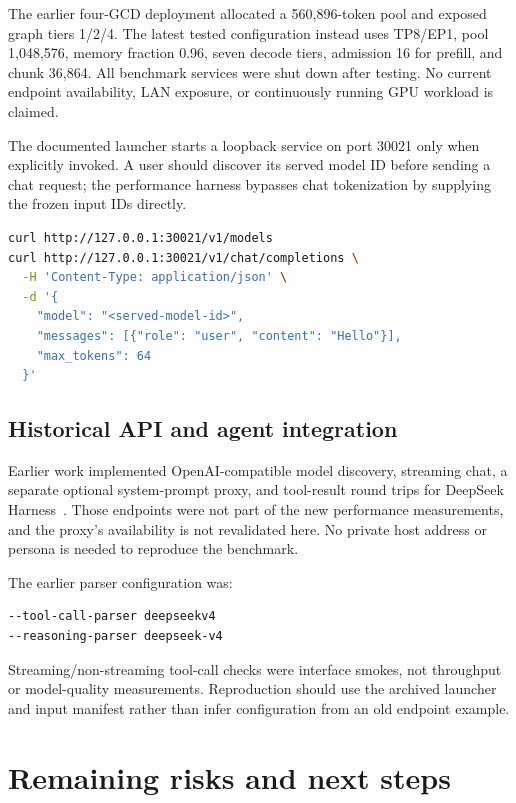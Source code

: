 \documentclass[sigplan,10pt]{acmart}
\begin{document}
The earlier four-GCD deployment allocated a 560,896-token pool and exposed graph tiers 1/2/4. The latest tested configuration instead uses TP8/EP1, pool 1,048,576, memory fraction 0.96, seven decode tiers, admission 16 for prefill, and chunk 36,864. All benchmark services were shut down after testing. No current endpoint availability, LAN exposure, or continuously running GPU workload is claimed.

The documented launcher starts a loopback service on port 30021 only when explicitly invoked. A user should discover its served model ID before sending a chat request; the performance harness bypasses chat tokenization by supplying the frozen input IDs directly.

\begin{lstlisting}[language=bash]
curl http://127.0.0.1:30021/v1/models
curl http://127.0.0.1:30021/v1/chat/completions \
  -H 'Content-Type: application/json' \
  -d '{
    "model": "<served-model-id>",
    "messages": [{"role": "user", "content": "Hello"}],
    "max_tokens": 64
  }'
\end{lstlisting}

\subsection{Historical API and agent integration}

Earlier work implemented OpenAI-compatible model discovery, streaming chat, a separate optional system-prompt proxy, and tool-result round trips for DeepSeek Harness~\cite{dsh}. Those endpoints were not part of the new performance measurements, and the proxy's availability is not revalidated here. No private host address or persona is needed to reproduce the benchmark.

The earlier parser configuration was:

\noindent\begin{minipage}{\linewidth}
\begin{lstlisting}
--tool-call-parser deepseekv4
--reasoning-parser deepseek-v4
\end{lstlisting}
\end{minipage}

Streaming/non-streaming tool-call checks were interface smokes, not throughput or model-quality measurements. Reproduction should use the archived launcher and input manifest rather than infer configuration from an old endpoint example.

\section{Remaining risks and next steps}
\end{document}
